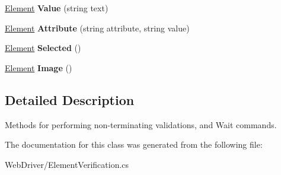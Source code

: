 \begin{DoxyCompactItemize}
\item 
\hypertarget{class_proto_test_1_1_golem_1_1_web_driver_1_1_element_verification_a0cc84feed713fa5219dd4999d45ac592}{\hyperlink{class_proto_test_1_1_golem_1_1_web_driver_1_1_element}{Element} {\bfseries Value} (string text)}\label{class_proto_test_1_1_golem_1_1_web_driver_1_1_element_verification_a0cc84feed713fa5219dd4999d45ac592}

\item 
\hypertarget{class_proto_test_1_1_golem_1_1_web_driver_1_1_element_verification_abfb38d3513b88cc56212c7459dbc7509}{\hyperlink{class_proto_test_1_1_golem_1_1_web_driver_1_1_element}{Element} {\bfseries Attribute} (string attribute, string value)}\label{class_proto_test_1_1_golem_1_1_web_driver_1_1_element_verification_abfb38d3513b88cc56212c7459dbc7509}

\item 
\hypertarget{class_proto_test_1_1_golem_1_1_web_driver_1_1_element_verification_afc4e97735173324770edff3c8e30658b}{\hyperlink{class_proto_test_1_1_golem_1_1_web_driver_1_1_element}{Element} {\bfseries Selected} ()}\label{class_proto_test_1_1_golem_1_1_web_driver_1_1_element_verification_afc4e97735173324770edff3c8e30658b}

\item 
\hypertarget{class_proto_test_1_1_golem_1_1_web_driver_1_1_element_verification_ad2e11ed7e6ea0cad63ae4e2eb79e7f68}{\hyperlink{class_proto_test_1_1_golem_1_1_web_driver_1_1_element}{Element} {\bfseries Image} ()}\label{class_proto_test_1_1_golem_1_1_web_driver_1_1_element_verification_ad2e11ed7e6ea0cad63ae4e2eb79e7f68}

\end{DoxyCompactItemize}


\subsection{Detailed Description}
Methods for performing non-\/terminating validations, and Wait commands. 



The documentation for this class was generated from the following file\-:\begin{DoxyCompactItemize}
\item 
Web\-Driver/Element\-Verification.\-cs\end{DoxyCompactItemize}
